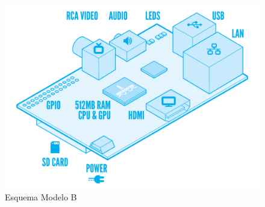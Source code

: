 \documentclass[twoside,12pt]{article}
\begin{document}
\begin{figure}[ht]
\centering
\includegraphics[scale=0.15]{images/RaspiModelB.png} 
\caption{Esquema Modelo B}
\label{fig:Esquema Modelo B}
\end{figure}
\end{document}
